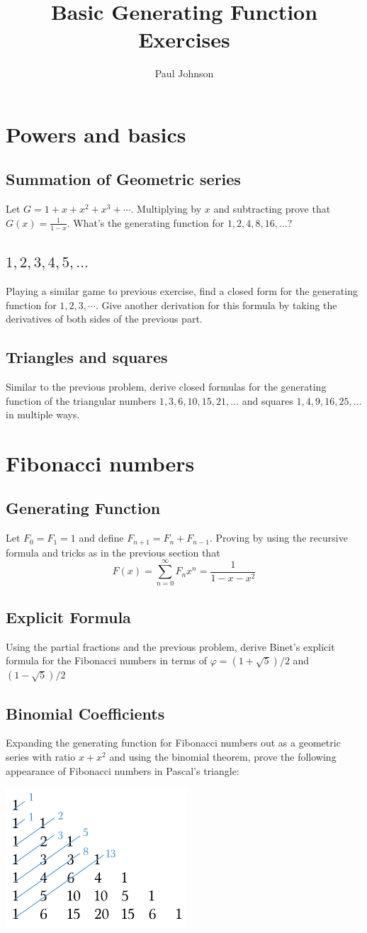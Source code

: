 \documentclass{article}
\title{Basic Generating Function Exercises}
\author{Paul Johnson}
\begin{document}
\maketitle
\section{Powers and basics}
\subsection{Summation of Geometric series}
Let $G=1+x+x^2+x^3+\cdots$.  Multiplying by $x$ and subtracting prove that $G(x)=\frac{1}{1-x}$.  What's the generating function for $1,2,4,8,16,\dots$?

\subsection{$1,2,3,4,5,\dots$}
Playing a similar game to previous exercise, find a closed form for the generating function for $1,2,3,\cdots$.  Give another derivation for this formula by taking the derivatives of both sides of the previous part.

\subsection{Triangles and squares}
Similar to the previous problem, derive closed formulas for the generating function of the triangular numbers $1,3,6,10,15,21,\dots$ and squares $1,4,9,16,25,\dots$ in multiple ways.  

\section{Fibonacci numbers}
\subsection{Generating Function}
Let $F_0=F_1=1$ and define $F_{n+1}=F_n+F_{n-1}$.  Proving by using the recursive formula and tricks as in the previous section that
$$F(x)=\sum_{n=0}^\infty F_nx^n=\frac{1}{1-x-x^2}$$

\subsection{Explicit Formula}
Using the partial fractions and the previous problem, derive Binet's explicit formula for the Fibonacci numbers in terms of $\varphi=(1+\sqrt{5})/2$ and $(1-\sqrt{5})/2$

\subsection{Binomial Coefficients}
Expanding the generating function for Fibonacci numbers out as a geometric series with ratio $x+x^2$ and using the binomial theorem, prove the following appearance of Fibonacci numbers in Pascal's triangle:

\includegraphics{FibPascal.png}
\end{document}
